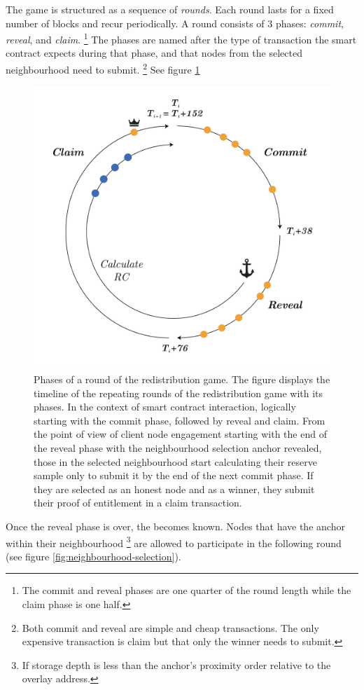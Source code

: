 The game is structured as a sequence of \emph{rounds}. Each round lasts for a fixed number of blocks and recur periodically. A round consists of 3 phases: \emph{commit}, \emph{reveal}, and \emph{claim}.%
%
\footnote{The commit and reveal phases are one quarter of the round length while the claim phase is one half.
}
%
The phases are named after the type of transaction the smart contract expects during that phase, and that nodes from the selected neighbourhood need to submit.%
%
\footnote{Both commit and reveal are simple and cheap transactions. The only expensive transaction is claim but that only the winner needs to submit.}
%
See figure \ref{fig:phases}

\begin{figure}[!ht]
  \centering
    \includegraphics[width=.5\textwidth]{fig/round-lifecycle.pdf}
  \caption[Phases of a round of the redistribution game]{Phases of a round of the redistribution game. The figure displays the timeline of the repeating rounds of the redistribution game with its phases. In the context of smart contract interaction, logically starting with the commit phase, followed by reveal and claim. From the point of view of client node engagement starting with the end of the reveal phase with the neighbourhood selection anchor revealed, those in the selected neighbourhood start calculating their reserve sample only to submit it by the end of the next commit phase. If they are selected as an honest node and as a winner, they submit their proof of entitlement in a claim transaction.}
\label{fig:phases}
\end{figure}    

Once the reveal phase is over, the   becomes known. Nodes that have the anchor within their neighbourhood%
%
\footnote{If storage depth is less than the anchor's proximity order relative to the overlay address.}
%
are  allowed to participate in the following round (see figure \ref{fig:neighbourhood-selection}).



